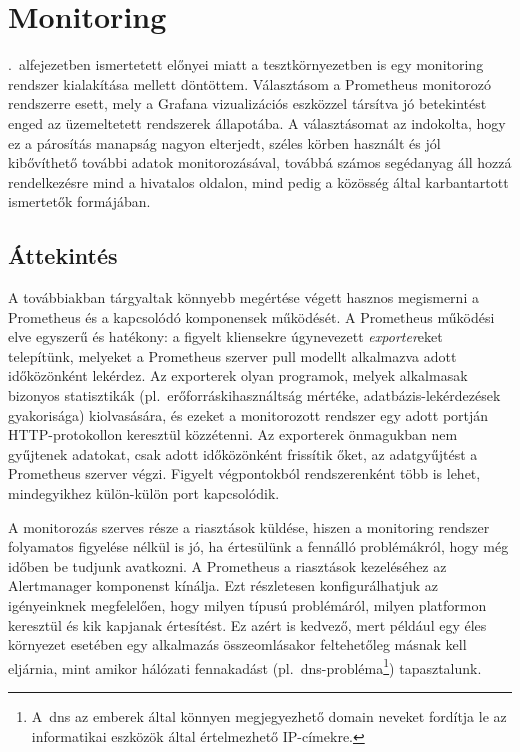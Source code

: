 
\chapter{Monitoring}
\label{chap:monitoring}
.~alfejezetben ismertetett előnyei miatt a tesztkörnyezetben is egy monitoring rendszer kialakítása mellett döntöttem. Választásom a Prometheus monitorozó rendszerre esett, mely a Grafana vizualizációs eszközzel társítva jó betekintést enged az üzemeltetett rendszerek állapotába. A választásomat az indokolta, hogy ez a párosítás manapság nagyon elterjedt, széles körben használt és jól kibővíthető további adatok monitorozásával, továbbá számos segédanyag áll hozzá rendelkezésre mind a hivatalos oldalon, mind pedig a közösség által karbantartott ismertetők formájában.

\section{Áttekintés}
A továbbiakban tárgyaltak könnyebb megértése végett hasznos megismerni a Prometheus és a kapcsolódó komponensek működését. A Prometheus működési elve egyszerű és hatékony: a figyelt kliensekre úgynevezett \textit{exporter}eket telepítünk, melyeket a Prometheus szerver pull modellt alkalmazva adott időközönként lekérdez. Az exporterek olyan programok, melyek alkalmasak bizonyos statisztikák (pl.~erőforráskihasználtság mértéke, adatbázis-lekérdezések gyakorisága) kiolvasására, és ezeket a monitorozott rendszer egy adott portján HTTP-protokollon keresztül közzétenni. Az exporterek önmagukban nem gyűjtenek adatokat, csak adott időközönként frissítik őket, az adatgyűjtést a Prometheus szerver végzi. Figyelt végpontokból rendszerenként több is lehet, mindegyikhez külön-külön port kapcsolódik.

A monitorozás szerves része a riasztások küldése, hiszen a monitoring rendszer folyamatos figyelése nélkül is jó, ha értesülünk a fennálló problémákról, hogy még időben be tudjunk avatkozni. A Prometheus a riasztások kezeléséhez az Alertmanager komponenst kínálja. Ezt részletesen konfigurálhatjuk az igényeinknek megfelelően, hogy milyen típusú problémáról, milyen platformon keresztül és kik kapjanak értesítést. Ez azért is kedvező, mert például egy éles környezet esetében egy alkalmazás összeomlásakor feltehetőleg másnak kell eljárnia, mint amikor hálózati fennakadást (pl.~\acrshort{dns}-probléma\footnote{A~\acrshort{dns} az emberek által könnyen megjegyezhető domain neveket fordítja le az informatikai eszközök által értelmezhető IP-címekre.}) tapasztalunk.

